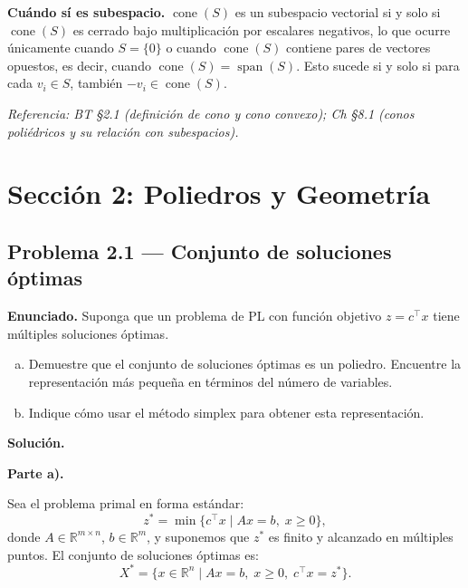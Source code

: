 \documentclass{article}
\begin{document}
\medskip
\noindent\textbf{Cuándo sí es subespacio.} $\operatorname{cone}(S)$ es un subespacio vectorial si y solo si $\operatorname{cone}(S)$ es cerrado bajo multiplicación por escalares negativos, lo que ocurre únicamente cuando $S = \{0\}$ o cuando $\operatorname{cone}(S)$ contiene pares de vectores opuestos, es decir, cuando $\operatorname{cone}(S) = \operatorname{span}(S)$. Esto sucede si y solo si para cada $v_i \in S$, también $-v_i \in \operatorname{cone}(S)$.

\medskip
\noindent\textit{Referencia: BT §2.1 (definición de cono y cono convexo); Ch §8.1 (conos poliédricos y su relación con subespacios).}

\newpage
\section*{Sección 2: Poliedros y Geometría}

\subsection*{Problema 2.1 — Conjunto de soluciones óptimas}

\textbf{Enunciado.} Suponga que un problema de PL con función objetivo $z = c^\top x$ tiene múltiples soluciones óptimas.
\begin{enumerate}[a)]
\item Demuestre que el conjunto de soluciones óptimas es un poliedro. Encuentre la representación más pequeña en términos del número de variables.
\item Indique cómo usar el método simplex para obtener esta representación.
\end{enumerate}

\medskip
\noindent\textbf{Solución.}

\medskip
\noindent\textbf{Parte a).}

Sea el problema primal en forma estándar:
\[
z^* = \min\{c^\top x \mid Ax = b,\; x \geq 0\},
\]
donde $A \in \mathbb{R}^{m \times n}$, $b \in \mathbb{R}^m$, y suponemos que $z^*$ es finito y alcanzado en múltiples puntos. El conjunto de soluciones óptimas es:
\[
X^* = \{x \in \mathbb{R}^n \mid Ax = b,\; x \geq 0,\; c^\top x = z^*\}.
\]
\end{document}

